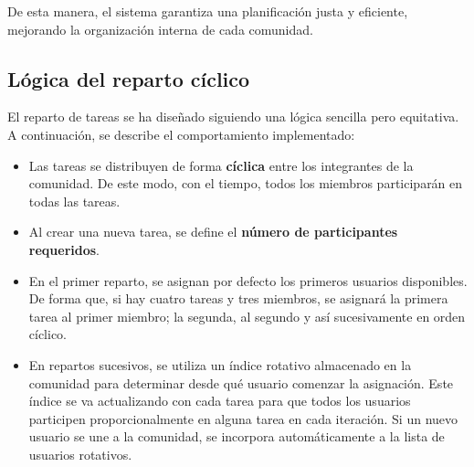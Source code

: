 De esta manera, el sistema garantiza una planificación justa y eficiente, mejorando la organización interna de cada comunidad.

\subsection*{Lógica del reparto cíclico}

El reparto de tareas se ha diseñado siguiendo una lógica sencilla pero equitativa. A continuación, se describe el comportamiento implementado:

\begin{itemize}
    \item Las tareas se distribuyen de forma \textbf{cíclica} entre los integrantes de la comunidad. De este modo, con el tiempo, todos los miembros participarán en todas las tareas.
    \item Al crear una nueva tarea, se define el \textbf{número de participantes requeridos}.
    \item En el primer reparto, se asignan por defecto los primeros usuarios disponibles. De forma que, si hay cuatro tareas y tres miembros, se asignará la primera tarea al primer miembro; la segunda, al segundo y así sucesivamente en orden cíclico.
    \item En repartos sucesivos, se utiliza un índice rotativo almacenado en la comunidad para determinar desde qué usuario comenzar la asignación. Este índice se va actualizando con cada tarea para que todos los usuarios participen proporcionalmente en alguna tarea en cada iteración. Si un nuevo usuario se une a la comunidad, se incorpora automáticamente a la lista de usuarios rotativos.
\end{itemize}

